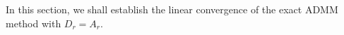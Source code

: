 In this section, we shall establish the linear convergence of the exact ADMM method with $D_r = A_r$.
\begin{comment} 
\begin{lemma}
The following holds true: for all $Y, Y_k$ in $\Reals{N_x}$, 
\begin{eqnarray}
\|A_r^*(Y) - A_r^*(Y_k) \| &\leq& \frac{1}{r + \lambda_F} \|Y- Y_k\|, \\ 
\|(I - \omega A_r^*) (Y) - (I - \omega A_r^*) (Y_k)   \| &\leq& \left(1 - \frac{\omega}{r + L_F} \right) \|Y -Y_k \|
\end{eqnarray}
\end{lemma}
\begin{proof}
    Note that $A_r^*(Y)$ corresponds to the gradient of the function $F_r^*(Y)$ that is the dual of $F_r(X) = F(X) + \frac{r}{2} \| X\|^2$. 
    $F_r^*$ is $\frac{1}{r +L_F}$-strongly convex and $\frac{1}{r + \lambda_F}$-smooth since $F_r$ is $(r + \lambda)$-strongly convex and $(r + L_F)$-smooth.
    Therefore, we have 
    \begin{equation}
        \|A_r^*(Y) - A_r^*(Y_k) \| \leq \frac{1}{r + \lambda_F} \|Y - Y_k\|. 
    \end{equation}

For $ (I -  \omega A_r^*)(Y)$, we have
 that the 
 \begin{equation}
 \begin{aligned}
    \|  I - \omega \nabla^2F^*_r(Y) \| 
 = \rho ( I - \omega \nabla^2F^*_r(Y)) & \leq \max \left\{|1 - \omega \lambda_{min}(\nabla^2 F_r^*(Y))|, | 1-\omega \lambda_{max} \nabla^2 F_r^*(Y)| \right\} \\
 & \leq \max \left\{  |1 - \frac{\omega}{r + L_F} |, | 1-\frac{\omega}{r + \lambda_F}| \right\}
 \end{aligned}
 \end{equation}
 where $\omega < \frac{2}{ \frac{1}{r + \lambda_F}}$ for any $Y$. 
 For optimal $\omega$ is $\frac{2}{ \frac{\omega}{r + \lambda_F}+ \frac{\omega}{r + L_F}}$, which leads to 
 \begin{equation}
    \| (I - \omega A_r^*)(Y) - (I - \omega A_r^*)(Y) \| \leq  \frac{\kappa - 1}{\kappa + 1} \|Y - Y_k \|,
\end{equation}
where $\kappa = \frac{r+L_F}{r+\lambda_F}$. 

In other analysis where we restrict $\omega \leq \frac{1}{ \frac{1}{r + \lambda_F} }$, we have the following optimal bound
\begin{equation}
    \| (I - \omega A_r^*)(Y) - (I - \omega A_r^*)(Y) \| \leq  \frac{\kappa - 1}{\kappa} \|Y - Y_k \|.
\end{equation}
\end{proof}
\begin{remark}
    This Hessian argument always requires $L$-smoothness of the objective thanks to the mollifier argument. See Lemma \ref{lemmaGD}.
\end{remark}
\end{comment} 

